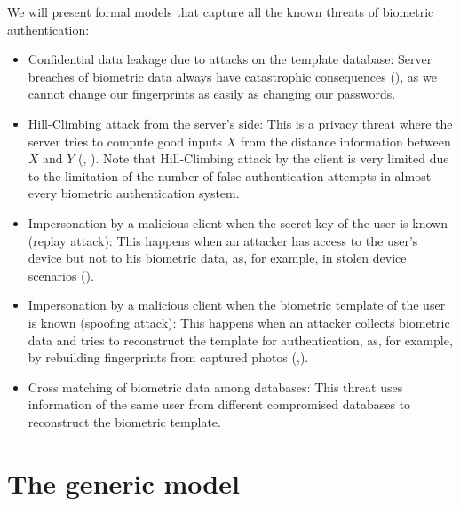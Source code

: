 We will present formal models that capture all the known threats of
biometric authentication:
\begin{itemize}
\item Confidential data leakage due to attacks on the template database: Server
  breaches of biometric data always have catastrophic consequences
  (\cite{OPMsays563:online}), as we cannot change our fingerprints as easily as
  changing our passwords.
\item Hill-Climbing attack from the server's side: This is a privacy threat
  where the server tries to compute good inputs $X$ from the distance
  information between $X$ and $Y$ (\cite{uludag2004attacks},
  \cite{higo2015privacy}). Note that Hill-Climbing attack by the client is very
  limited due to the limitation of the number of false authentication attempts
  in almost every biometric authentication system.
\item Impersonation by a malicious client when the secret key of the user is
  known (replay attack): This happens when an attacker has access to the user's
  device but not to his biometric data, as, for example, in stolen device
  scenarios (\cite{zhang2015fingerprints}).
\item Impersonation by a malicious client when the biometric template of the
  user is known (spoofing attack): This happens when an attacker collects
  biometric data and tries to reconstruct the template for authentication, as,
  for example, by rebuilding fingerprints from captured photos
  (\cite{zhang2015fingerprints},\cite{feng2011fingerprint}).
\item Cross matching of biometric data among databases: This threat uses
  information of the same user from different compromised databases to
  reconstruct the biometric template.
\end{itemize}

\section{The generic model}

